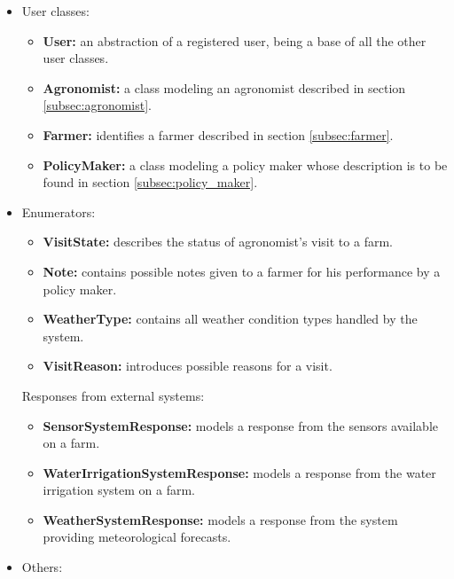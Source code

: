 \begin{itemize}
    \item User classes:
    
    \begin{itemize}
        \item \textbf{User:} an abstraction of a registered user, being a base of all the other user classes.
        \item \textbf{Agronomist:} a class modeling an agronomist described in section \ref{subsec:agronomist}.
        \item \textbf{Farmer:} identifies a farmer described in section \ref{subsec:farmer}.
        \item \textbf{PolicyMaker:} a class modeling a policy maker whose description is to be found in section \ref{subsec:policy_maker}.
    \end{itemize}
    
    \item Enumerators:
    
    \begin{itemize}
        \item \textbf{VisitState:} describes the status of agronomist's visit to a farm.
        \item \textbf{Note:} contains possible notes given to a farmer for his performance by a policy maker.
        \item \textbf{WeatherType:} contains all weather condition types handled by the system.
        \item \textbf{VisitReason:} introduces possible reasons for a visit.
    \end{itemize}
    
    Responses from external systems:
    
    \begin{itemize}
        \item \textbf{SensorSystemResponse:} models a response from the sensors available on a farm.
        \item \textbf{WaterIrrigationSystemResponse:} models a response from the water irrigation system on a farm.
        \item \textbf{WeatherSystemResponse:} models a response from the system providing meteorological forecasts.
    \end{itemize}
    
    \item Others:
    

\end{itemize}

